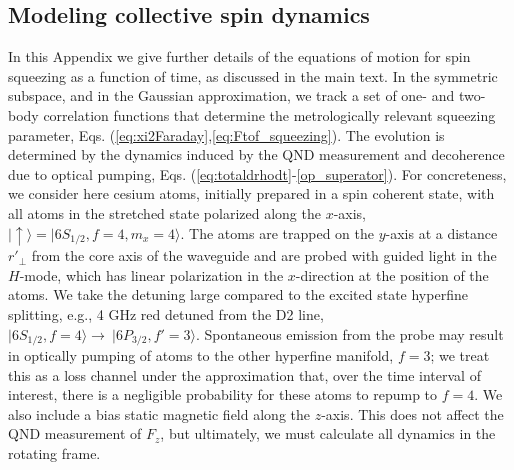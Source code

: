 \documentclass[aps,pra,twocolumn,superscriptaddress]{revtex4-1} %
\def\ket#1{\lvert{#1}\rangle}%
\begin{document}


\begin{appendix}
\section{Modeling collective spin dynamics}\label{Sec::opticalpumpinginrotatingframe}
In this Appendix we give further details of the equations of motion for spin squeezing as a function of time, as discussed in the main text.  In the symmetric subspace, and in the Gaussian approximation, we track a set of one- and two-body correlation functions that determine the metrologically relevant squeezing parameter, Eqs. (\ref{eq:xi2Faraday},\ref{eq:Ftof_squeezing}).   The evolution is determined by the dynamics induced by the QND measurement and decoherence due to optical pumping, Eqs. (\ref{eq:totaldrhodt}-\ref{op_superator}).   For concreteness, we consider here cesium atoms,  initially prepared in a spin coherent state, with all atoms in the stretched state polarized along the $x$-axis, $\ket{\uparrow} = \ket{6S_{1/2}, f=4, m_x=4}$.  The atoms are trapped on the $y$-axis at a distance $r'_\perp$ from the core axis of the waveguide and are probed with guided light in the $H$-mode, which has linear polarization in the $x$-direction at the position of the atoms.   We take the detuning large compared to the excited state hyperfine splitting, e.g., 4 GHz red detuned from the D2 line,  $\ket{6S_{1/2}, f=4}\rightarrow \ \ket{6P_{3/2},f'=3}$.   Spontaneous emission from the probe may result in optically pumping of atoms to the other  hyperfine manifold, $f=3$; we treat this as a loss channel under the approximation that, over the time interval of interest, there is a negligible probability for these atoms to repump to $f=4$.  We also include a bias static magnetic field along the $z$-axis.  This does not affect the QND measurement of $F_z$, but ultimately, we must  calculate all dynamics in the rotating frame.


\end{appendix}
\end{document}
